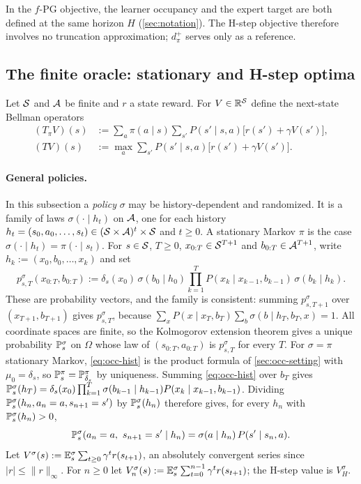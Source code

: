 \begin{remark}
In the $f$-PG objective, the learner occupancy and the expert target are both defined at the same horizon $H$ (\cref{sec:notation}).
The H-step objective therefore involves no truncation approximation; $d^+_\pi$ serves only as a reference.
\end{remark}

\subsection{The finite oracle: stationary and H-step optima}\label{sec:occ-oracle}

Let $\mathcal{S}$ and $\mathcal{A}$ be finite and $r$ a state reward. For $V\in\mathbb{R}^{\mathcal{S}}$ define the next-state Bellman operators
\begin{align*}
(T_\pi V)(s)&:=\sum_a\pi(a\mid s)\sum_{s'}P(s'\mid s,a)\big[r(s')+\gamma V(s')\big],\\
(TV)(s)&:=\max_a\sum_{s'}P(s'\mid s,a)\big[r(s')+\gamma V(s')\big].
\end{align*}
\paragraph{General policies.}
In this subsection a \emph{policy} $\sigma$ may be history-dependent and randomized.
It is a family of laws $\sigma(\cdot\mid h_t)$ on $\mathcal{A}$, one for each history $h_t=(s_0,a_0,\dots,s_t)\in(\mathcal{S}\times\mathcal{A})^t\times\mathcal{S}$ and $t\ge0$.
A stationary Markov $\pi$ is the case $\sigma(\cdot\mid h_t)=\pi(\cdot\mid s_t)$.
For $s\in\mathcal{S}$, $T\ge0$, $x_{0:T}\in\mathcal{S}^{T+1}$ and $b_{0:T}\in\mathcal{A}^{T+1}$, write $h_k:=(x_0,b_0,\dots,x_k)$ and set
\begin{equation}\label{eq:occ-hist}
p^\sigma_{s,T}(x_{0:T},b_{0:T}):=\delta_s(x_0)\,\sigma(b_0\mid h_0)\prod_{k=1}^{T}P(x_k\mid x_{k-1},b_{k-1})\,\sigma(b_k\mid h_k).
\end{equation}
These are probability vectors, and the family is consistent: summing $p^\sigma_{s,T+1}$ over $(x_{T+1},b_{T+1})$ gives $p^\sigma_{s,T}$, because $\sum_{x}P(x\mid x_T,b_T)\sum_b\sigma(b\mid h_T,b_T,x)=1$.
All coordinate spaces are finite, so the Kolmogorov extension theorem gives a unique probability $\mathbb{P}^\sigma_s$ on $\Omega$ whose law of $(s_{0:T},a_{0:T})$ is $p^\sigma_{s,T}$ for every $T$.
For $\sigma=\pi$ stationary Markov, \eqref{eq:occ-hist} is the product formula of \cref{sec:occ-setting} with $\mu_0=\delta_s$, so $\mathbb{P}^\pi_s=\mathbb{P}^\pi_{\delta_s}$ by uniqueness.
Summing \eqref{eq:occ-hist} over $b_T$ gives $\mathbb{P}^\sigma_s(h_T)=\delta_s(x_0)\prod_{k=1}^{T}\sigma(b_{k-1}\mid h_{k-1})P(x_k\mid x_{k-1},b_{k-1})$.
Dividing $\mathbb{P}^\sigma_s(h_n,a_n=a,s_{n+1}=s')$ by $\mathbb{P}^\sigma_s(h_n)$ therefore gives, for every $h_n$ with $\mathbb{P}^\sigma_s(h_n)>0$,
\begin{equation}\label{eq:occ-hist-cond}
\mathbb{P}^\sigma_s(a_n=a,\ s_{n+1}=s'\mid h_n)=\sigma(a\mid h_n)\,P(s'\mid s_n,a).
\end{equation}
Let $V^\sigma(s):=\mathbb{E}^\sigma_s\sum_{t\ge0}\gamma^tr(s_{t+1})$, an absolutely convergent series since $|r|\le\|r\|_\infty$.
For $n\ge0$ let $V^\sigma_n(s):=\mathbb{E}^\sigma_s\sum_{t=0}^{n-1}\gamma^tr(s_{t+1})$; the H-step value is $V^\sigma_H$.

